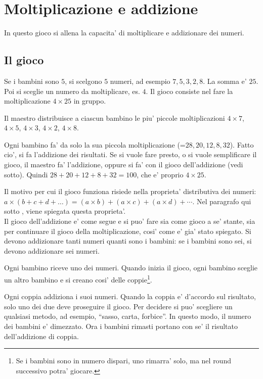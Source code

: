 \documentclass[a4paper]{article}
\begin{document}
\section{Moltiplicazione e addizione}
In questo gioco si allena la capacita' di moltiplicare e addizionare dei numeri.

\subsection{Il gioco}
Se i bambini sono $5$, si scelgono $5$ numeri, ad esempio $7,5,3,2,8$. La somma e' $25$. Poi si sceglie un numero da moltiplicare, es. $4$. Il gioco consiste nel fare la moltiplicazione $4\times 25$ in gruppo.

Il maestro distribuisce a ciascun bambino le piu' piccole moltiplicazioni $4\times 7$, $4\times 5$, $4\times 3$, $4\times 2$, $4\times 8$.

Ogni bambino fa' da solo la sua piccola moltiplicazione (=$28, 20, 12, 8, 32$). Fatto cio', si fa l'addizione dei risultati. Se si vuole fare presto, o si vuole semplificare il gioco, il maestro fa' l'addizione, oppure si fa' con il gioco dell'addizione (vedi sotto). Quindi $28+20+12+8+32 = 100$, che e' proprio $4\times 25 $.

Il motivo per cui il gioco funziona risiede nella proprieta' distributiva dei numeri: $a \times (b+c+d+\ldots) = (a\times b)+(a\times c)+(a\times d)+\cdots$. Nel paragrafo qui sotto , viene spiegata questa proprieta'.\\

Il gioco dell'addizione e' come segue e si puo' fare sia come gioco a se' stante, sia per continuare il gioco della moltiplicazione, cosi' come e' gia' stato spiegato.  Si devono addizionare tanti numeri quanti sono i bambini: se i bambini sono sei, si devono addizionare sei numeri.

Ogni bambino riceve uno dei numeri. Quando inizia il gioco, ogni bambino sceglie un altro bambino e si creano cosi' delle coppie\footnote{Se i bambini sono in numero dispari, uno rimarra' solo, ma nel round successivo potra' giocare.}.

Ogni coppia addiziona i suoi numeri. Quando la coppia e' d'accordo sul risultato, solo uno dei due deve proseguire il gioco. Per decidere si puo' scegliere un qualsiasi metodo, ad esempio, ``sasso, carta, forbice''. In questo modo, il numero dei bambini e' dimezzato. Ora i bambini rimasti portano con se' il risultato dell'addizione di coppia.
\end{document}
